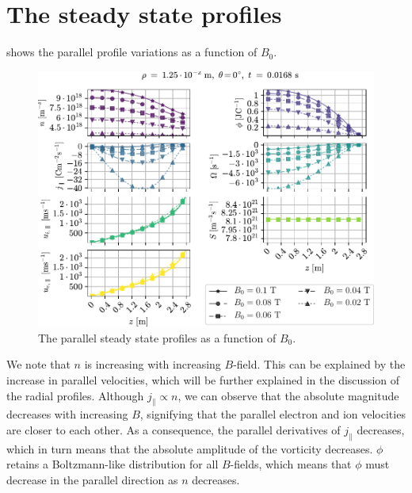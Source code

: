 \section{The steady state profiles}
\label{sec:BScanSS}
%
 shows the parallel profile variations as a function of $B_0$.
%
\begin{figure}[htb]
    \centering
    \includegraphics{fig/results/bScan/BScanPar}
    \caption{The parallel steady state profiles as a function of $B_0$.}
    \label{fig:BScanPar}
\end{figure}
%
We note that $n$ is increasing with increasing $B$-field.
This can be explained by the increase in parallel velocities, which will be further explained in the discussion of the radial profiles.
Although $j_\| \propto n$, we can observe that the absolute magnitude decreases with increasing $B$, signifying that the parallel electron and ion velocities are closer to each other.
As a consequence, the parallel derivatives of $j_\|$ decreases, which in turn means that the absolute amplitude of the vorticity decreases.
$\phi$ retains a Boltzmann-like distribution for all $B$-fields, which means that $\phi$ must decrease in the parallel direction as $n$ decreases.

